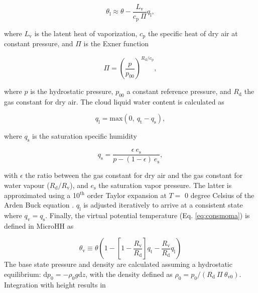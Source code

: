 \documentclass[gmd,manuscript]{copernicus}
\begin{document}
\begin{equation}
\theta_\mathrm{l} \approx \theta - \frac{L_\mathrm{v}}{c_\mathrm{p} ~ \Pi} q_\mathrm{l}, 	
\end{equation}

\noindent where $L_\mathrm{v}$ is the latent heat of vaporization, $c_\mathrm{p}$ the specific heat of dry air at constant pressure, and $\Pi$ is the Exner function

\begin{equation}
\Pi = \left( \frac{p}{p_{00}} \right)^{R_\mathrm{d} / c_\mathrm{p}},
\end{equation}

\noindent where $p$ is the hydrostatic pressure, $p_\mathrm{00}$ a constant reference pressure, and $R_\mathrm{d}$ the gas constant for dry air. The cloud liquid water content is calculated as

\begin{equation}
q_\mathrm{l} = \mathrm{max}(0, ~q_\mathrm{t} - q_\mathrm{s}),
\end{equation}

\noindent where $q_\mathrm{s}$ is the saturation specific humidity

\begin{equation}
q_\mathrm{s} = \frac{\epsilon ~ e_\mathrm{s}}{p - (1-\epsilon) ~ e_\mathrm{s}},
\end{equation}

\noindent with $\epsilon$ the ratio between the gas constant for dry air and the gas constant for water vapour ($R_\mathrm{d}/R_\mathrm{v}$), and $e_\mathrm{s}$ the saturation vapor pressure. The latter is approximated using a 10$^\mathrm{th}$ order Taylor expansion at $T=$ 0 degree Celsius of the Arden Buck equation \citep{Buck1981}. $q_\mathrm{l}$ is adjusted iteratively to arrive at a consistent state where $q_\mathrm{v} = q_\mathrm{s}$. Finally, the virtual potential temperature (Eq. \ref{eq:consmoma}) is defined in MicroHH as 

\begin{equation}
\theta_\mathrm{v} \equiv  \theta \left(1-\left[1-\frac{R_\mathrm{v}}{R_\mathrm{d}}\right] q_\mathrm{t} - \frac{R_\mathrm{v}}{R_\mathrm{d}} q_\mathrm{l} \right)
\end{equation}
The base state pressure and density are calculated assuming a hydrostatic equilibrium: $\mathrm{d}p_0 = -\rho_0 g \mathrm{d}z$, with the density defined as $\rho_0 = p_0 / (R_\mathrm{d} ~ \Pi ~ \theta_\mathrm{v0})$. Integration with height results in
\end{document}

